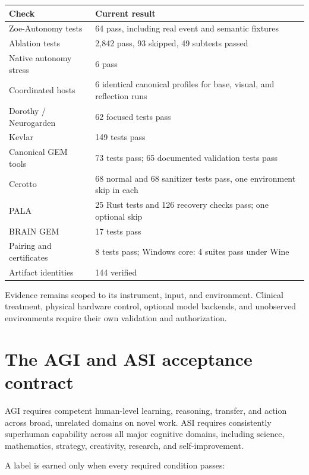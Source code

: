 \documentclass[11pt]{article}
\begin{document}
\begin{longtable}{p{}p{}}
\toprule
\textbf{Check} & \textbf{Current result}\\
\midrule
Zoe-Autonomy tests & 64 pass, including real event and semantic fixtures\\
Ablation tests & 2,842 pass, 93 skipped, 49 subtests passed\\
Native autonomy stress & 6 pass\\
Coordinated hosts & 6 identical canonical profiles for base, visual, and reflection runs\\
Dorothy / Neurogarden & 62 focused tests pass\\
Kevlar & 149 tests pass\\
Canonical GEM tools & 73 tests pass; 65 documented validation tests pass\\
Cerotto & 68 normal and 68 sanitizer tests pass, one environment skip in each\\
PALA & 25 Rust tests and 126 recovery checks pass; one optional skip\\
BRAIN GEM & 17 tests pass\\
Pairing and certificates & 8 tests pass; Windows core: 4 suites pass under Wine\\
Artifact identities & 144 verified\\
\bottomrule
\end{longtable}

Evidence remains scoped to its instrument, input, and environment. Clinical treatment, physical hardware control, optional model backends, and unobserved environments require their own validation and authorization.

\clearpage
\section{The AGI and ASI acceptance contract}

AGI requires competent human-level learning, reasoning, transfer, and action across broad, unrelated domains on novel work. ASI requires consistently superhuman capability across all major cognitive domains, including science, mathematics, strategy, creativity, research, and self-improvement.

A label is earned only when every required condition passes:
\end{document}
